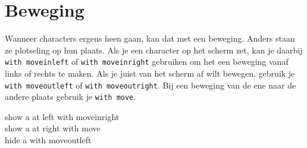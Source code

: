 \documentclass{article}
\newcommand\code[1]{\par\noindent\begin{texttt}#1\end{texttt}\par}
\begin{document}
\section{Beweging}
Wanneer characters ergens heen gaan, kan dat met een beweging. Anders staan ze
plotseling op hun plaats. Als je een character op het scherm zet, kan je
daarbij \verb-with moveinleft- of \verb-with moveinright- gebruiken om het een
beweging vanaf links of rechts te maken. Als je juist van het scherm af wilt
bewegen, gebruik je \verb-with moveoutleft- of \verb-with moveoutright-. Bij
een beweging van de ene naar de andere plaats gebruik je \verb-with move-.
\code{show a at left with moveinright\\
show a at right with move\\
hide a with moveoutleft}
\end{document}
